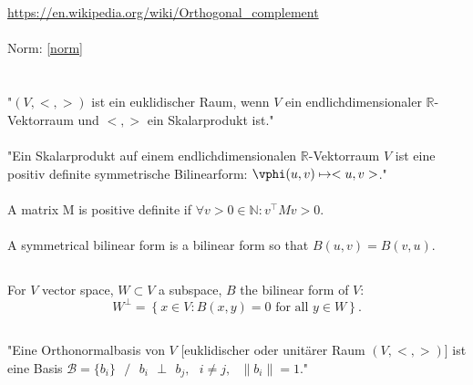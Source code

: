 \documentclass{report}
\begin{document}
\section{}

\url{https://en.wikipedia.org/wiki/Orthogonal_complement}
\\
\\
Norm: \ref{norm}

\section{}

\subsection{}

"$(V,<,>)$ ist ein euklidischer Raum, wenn $V$ ein endlichdimensionaler $\mathbb{R}$-Vektorraum und $<,>$ ein Skalarprodukt ist."
\\
\\
"Ein Skalarprodukt auf einem endlichdimensionalen $\mathbb{R}$-Vektorraum $V$ ist eine positiv definite symmetrische Bilinearform: $\vphi(u,v)\mapsto<u,v>$."
\\
\\
\label{posdef}A matrix M is positive definite if $\forall v>0\in \mathbb{N}: v^\top M v > 0$.
\\
\\
A symmetrical bilinear form is a bilinear form so that $B(u,v)=B(v,u)$.

\subsection{}
For $V$ vector space, $W\subset V$ a subspace, $B$ the bilinear form of $V$:
$$W^{\bot }=\left\{x\in V:B(x,y)=0{\mbox{ for all }}y\in W\right\}.$$

\subsection{}

"Eine Orthonormalbasis von $V$ [euklidischer oder unit\"arer Raum $(V,<,>)$] ist eine Basis $\mathcal{B} = \{b_i\}\textrm{ } /\textrm{ }  b_i\textrm{ }\bot\textrm{ }b_j,\textrm{ } i\neq j,\textrm{ } \|b_i\|=1$."

\subsection{}
\end{document}
